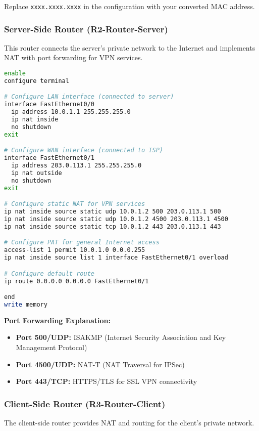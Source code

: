 Replace \texttt{xxxx.xxxx.xxxx} in the configuration with your converted MAC address.

\subsubsection{Server-Side Router (R2-Router-Server)}

This router connects the server's private network to the Internet and implements NAT with port forwarding for VPN services.

\begin{lstlisting}[language=bash]
enable
configure terminal

# Configure LAN interface (connected to server)
interface FastEthernet0/0
  ip address 10.0.1.1 255.255.255.0
  ip nat inside
  no shutdown
exit

# Configure WAN interface (connected to ISP)
interface FastEthernet0/1
  ip address 203.0.113.1 255.255.255.0
  ip nat outside
  no shutdown
exit

# Configure static NAT for VPN services
ip nat inside source static udp 10.0.1.2 500 203.0.113.1 500
ip nat inside source static udp 10.0.1.2 4500 203.0.113.1 4500
ip nat inside source static tcp 10.0.1.2 443 203.0.113.1 443

# Configure PAT for general Internet access
access-list 1 permit 10.0.1.0 0.0.0.255
ip nat inside source list 1 interface FastEthernet0/1 overload

# Configure default route
ip route 0.0.0.0 0.0.0.0 FastEthernet0/1

end
write memory
\end{lstlisting}

\noindent
\textbf{Port Forwarding Explanation:}
\begin{itemize}
    \item \textbf{Port 500/UDP:} ISAKMP (Internet Security Association and Key Management Protocol)
    \item \textbf{Port 4500/UDP:} NAT-T (NAT Traversal for IPSec)
    \item \textbf{Port 443/TCP:} HTTPS/TLS for SSL VPN connectivity
\end{itemize}

\subsubsection{Client-Side Router (R3-Router-Client)}

The client-side router provides NAT and routing for the client's private network.

